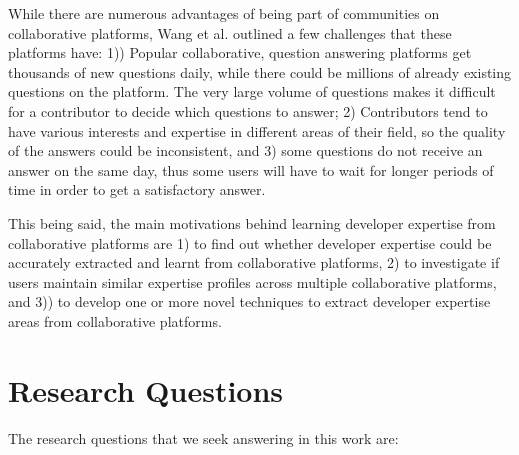             While there are numerous advantages of being part of communities on collaborative platforms, Wang et al. \cite{wang2018survey} outlined a few challenges that these platforms have: 1)) Popular collaborative, question answering platforms get thousands of new questions daily, while there could be millions of already existing questions on the platform. The very large volume of questions makes it difficult for a contributor to decide which questions to answer; 2) Contributors tend to have various interests and expertise in different areas of their field, so the quality of the answers could be inconsistent, and 3) some questions do not receive an answer on the same day, thus some users will have to wait for longer periods of time in order to get a satisfactory answer. 
            
            This being said, the main motivations behind learning developer expertise from collaborative platforms are 1) to find out whether developer expertise could be accurately extracted and learnt from collaborative platforms, 2) to investigate if users maintain similar expertise profiles across multiple collaborative platforms, and 3)) to develop one or more novel techniques to extract developer expertise areas from collaborative platforms.
    
    \section{Research Questions\label{sec:RQs}}
        The research questions that we seek answering in this work are:
    
